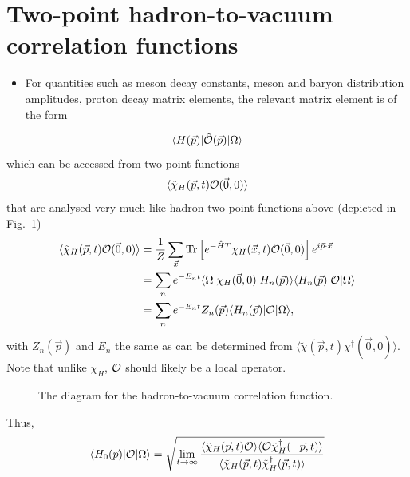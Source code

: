 \section{Two-point hadron-to-vacuum correlation functions}
\begin{itemize}
    \item For quantities such as meson decay constants, meson and baryon distribution amplitudes, proton decay matrix elements, the relevant matrix element is of the form
\end{itemize}
\begin{equation}
    \langle H(\vec{p}) | \tilde{{\cal O}}(\vec{p}) | \Omega \rangle
\end{equation}
which can be accessed from two point functions
\begin{equation}
    \langle \tilde{\chi}_H(\vec{p},t) {\cal O}(\vec{0},0)\rangle
\end{equation}
that are analysed very much like hadron two-point functions above (depicted in Fig.~\ref{fig:hvac})
\begin{align}
    \langle \tilde{\chi}_H(\vec{p},t){\cal O}(\vec{0},0)\rangle &= \frac{1}{Z}\sum_{\vec{x}} \operatorname{Tr}\left[ e^{-\hat{H} T} \chi_H(\vec{x}, t) {\cal O}(\vec{0}, 0)\right] e^{i \vec{p} \cdot \vec{x}} \nonumber \\
    &= \sum_n e^{- E_n t}\langle \Omega | \chi_H(\vec{0}, 0) | H_n(\vec{p})\rangle \langle H_n(\vec{p}) | {\cal O} | \Omega \rangle \nonumber \\
    &= \sum_n e^{-E_n t} Z_n(\vec{p}) \langle H_n(\vec{p})|{\cal O}|\Omega\rangle,
\end{align}
with $Z_n(\vec{p})$ and $E_n$ the same as can be determined from $\langle \tilde{\chi}(\vec{p},t) \chi^\dagger(\vec{0},0)\rangle$. Note that unlike $\chi_H$, ${\cal O}$ should likely be a local operator.
\begin{figure}
    \centering
    \caption{The diagram for the hadron-to-vacuum correlation function.}
    \label{fig:hvac}
\end{figure}
Thus,
\begin{equation}
    \langle H_0(\vec{p})| {\cal O}|\Omega \rangle = \sqrt{\lim_{t\to\infty} \frac{\langle\tilde{\chi}_H(\vec{p}, t) {\cal O} \rangle \langle {\cal O} \tilde{\chi}^\dagger_H(-\vec{p}, t)\rangle}{\langle\tilde{\chi}_H(\vec{p},t) \tilde{\chi}_H^\dagger(\vec{p}, t) \rangle}}
\end{equation}

